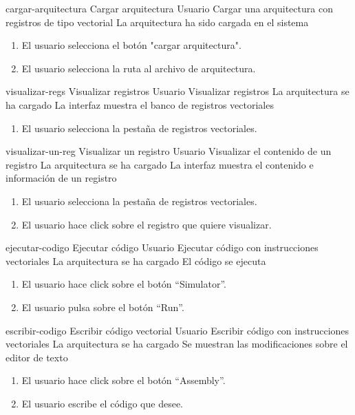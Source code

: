 \begin{useCase}{cargar-arquitectura}
  {Cargar arquitectura}
  {Usuario}
  {Cargar una arquitectura con registros de tipo vectorial}
  {\NA}
  {La arquitectura ha sido cargada en el sistema}
  \begin{enumerate}
    \item El usuario selecciona el botón "cargar arquitectura".
    \item El usuario selecciona la ruta al archivo de arquitectura.
  \end{enumerate}
\end{useCase}

\begin{useCase}{visualizar-regs}
  {Visualizar registros}
  {Usuario}
  {Visualizar registros}
  {La arquitectura se ha cargado}
  {La interfaz muestra el banco de registros vectoriales}
  \begin{enumerate}
    \item El usuario selecciona la pestaña de registros vectoriales.
  \end{enumerate}
\end{useCase}

\begin{useCase}{visualizar-un-reg}
  {Visualizar un registro}
  {Usuario}
  {Visualizar el contenido de un registro}
  {La arquitectura se ha cargado}
  {La interfaz muestra el contenido e información de un registro}
  \begin{enumerate}
    \item El usuario selecciona la pestaña de registros vectoriales.
    \item El usuario hace click  sobre el registro que quiere visualizar.
  \end{enumerate}
\end{useCase}

\begin{useCase}{ejecutar-codigo}
  {Ejecutar código}
  {Usuario}
  {Ejecutar código con instrucciones vectoriales}
  {La arquitectura se ha cargado}
  {El código se ejecuta}
  \begin{enumerate}
    \item El usuario hace click sobre el botón ``Simulator''.
    \item El usuario pulsa sobre el botón ``Run''.
  \end{enumerate}
\end{useCase}

\begin{useCase}{escribir-codigo}
  {Escribir código vectorial}
  {Usuario}
  {Escribir código con instrucciones vectoriales}
  {La arquitectura se ha cargado}
  {Se muestran las modificaciones sobre el editor de texto}
  \begin{enumerate}
    \item El usuario hace click sobre el botón ``Assembly''.
    \item El usuario escribe el código que desee.
  \end{enumerate}
\end{useCase}

